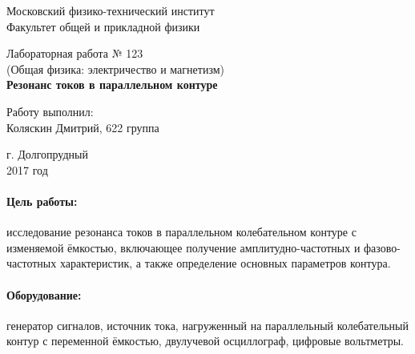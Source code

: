 \documentclass[12pt]{kiarticle}
\begin{document}
\begin{titlepage}
	\begin{center}
		\large 	Московский физико-технический институт \\
		Факультет общей и прикладной физики \\
		\vspace{0.2cm}
		
		\vspace{4.5cm}
		Лабораторная работа № 123 \\ \vspace{0.2cm}
		\large (Общая физика: электричество и магнетизм) \\ \vspace{0.2cm}
		\LARGE \textbf{Резонанс токов в параллельном контуре}
	\end{center}
	\vspace{2.3cm} \large
	
	\begin{center}
		Работу выполнил: \\
		Коляскин Дмитрий,
		622 группа
		\vspace{10mm}		
		
	\end{center}
	
	\begin{center} \vspace{60mm}
		г. Долгопрудный \\
		2017 год
	\end{center}
\end{titlepage}



\paragraph*{Цель работы:} исследование резонанса токов в параллельном колебательном контуре с изменяемой
ёмкостью, включающее получение амплитудно-частотных и фазово-частотных характеристик, а также определение основных параметров контура.

\paragraph*{Оборудование:} генератор сигналов, источник тока, нагруженный на параллельный колебательный контур с переменной ёмкостью, двулучевой осциллограф, цифровые вольтметры.
\end{document}
